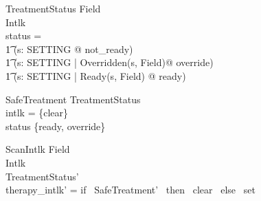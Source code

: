 \documentclass{llncs}
\begin{document}
\begin{schema}{TreatmentStatus}
Field \\
Intlk \\
\where status = \\
\t1 (\lambda s: SETTING @ not\_ready) \oplus \\
\t1 (\lambda s: SETTING | Overridden(s, \theta Field)@ override)
\oplus \\
\t1 (\lambda s: SETTING | Ready(s, \theta Field) @ ready)
\end{schema}

\begin{schema}{SafeTreatment}
TreatmentStatus \\
\where \ran intlk = \{clear\} \\
\ran status \subseteq \{ready, override\}
\end{schema}

\begin{schema}{ScanIntlk}
\Xi Field \\
\Delta Intlk \\
\where TreatmentStatus' \\
therapy\_intlk' = if \, SafeTreatment' \, then \, clear \, else \,
set
\end{schema}
\end{document}
